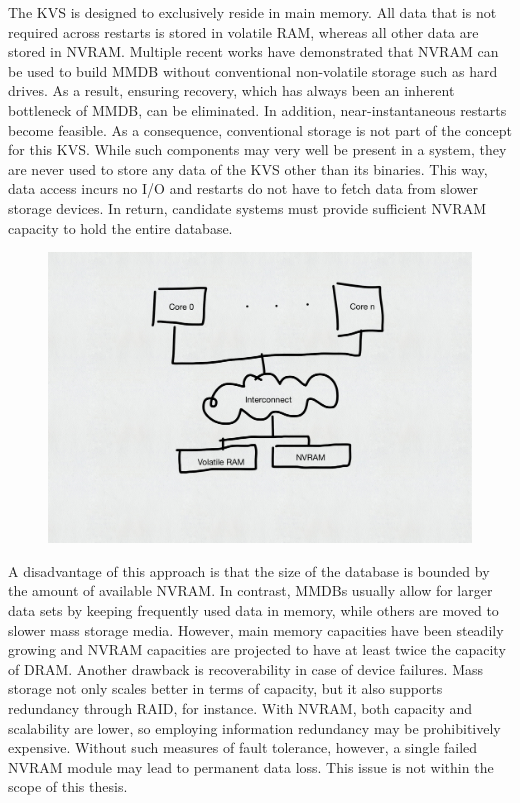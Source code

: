 The \ac{KVS} is designed to exclusively reside in main memory. All data that is
not required across restarts is stored in volatile \ac{RAM}, whereas all other
data are stored in \ac{NVRAM}. Multiple recent works have demonstrated that
\ac{NVRAM} can be used to build \ac{MMDB} without conventional non-volatile
storage such as hard drives. As a result, ensuring recovery, which has always
been an inherent bottleneck of \ac{MMDB}, can be eliminated. In addition,
near-instantaneous restarts become feasible. As a consequence, conventional
storage is not part of the concept for this \ac{KVS}. While such components may
very well be present in a system, they are never used to store any data of the
\ac{KVS} other than its binaries. This way, data access incurs no I/O and
restarts do not have to fetch data from slower storage devices. In return,
candidate systems must provide sufficient \ac{NVRAM} capacity to hold the entire
database.

\begin{figure}[h!]
    \centering
    \includegraphics[scale=0.5]{figures/drafts/concept-sys-mem.pdf}
    \caption{}
    \label{fig:concept-sys-mem}
\end{figure}

A disadvantage of this approach is that the size of the database is bounded by
the amount of available \ac{NVRAM}. In contrast, \acp{MMDB} usually allow for
larger data sets by keeping frequently used data in memory, while others are
moved to slower mass storage media. However, main memory capacities have been
steadily growing and \ac{NVRAM} capacities are projected to have at least twice
the capacity of \ac{DRAM}. Another drawback is recoverability in case of device
failures. Mass storage not only scales better in terms of capacity, but it also
supports redundancy through \ac{RAID}, for instance. With \ac{NVRAM}, both
capacity and scalability are lower, so employing information redundancy may be
prohibitively expensive. Without such measures of fault tolerance, however, a
single failed \ac{NVRAM} module may lead to permanent data loss. This issue is
not within the scope of this thesis.

